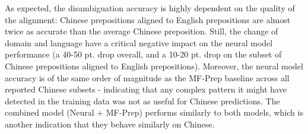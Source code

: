 As expected, the disambiguation accuracy is highly dependent on the quality of the alignment: Chinese prepositions aligned to English prepositions are almost twice as accurate than the average Chinese preposition. Still, the change of domain and language have a critical negative impact on the neural model performance (a 40-50 pt. drop overall, and a 10-20 pt. drop on the subset of Chinese prepositions aligned to English prepositions). Moreover, the neural model accuracy is of the same order of magnitude as the MF-Prep baseline across all reported Chinese subsets - indicating that any complex pattern it might have detected in the training data was not as useful for Chinese predictions. The combined model (Neural + MF-Prep) performs similarly to both models, which is another indication that they behave similarly on Chinese.










